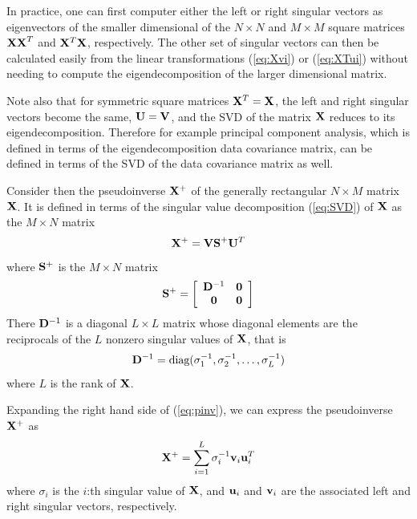 \begin{enumerate}
\begin{solution}
    In practice, one can first computer either the left or right singular vectors
    as eigenvectors of the smaller dimensional of the $N \times N$ and $M \times M$
    square matrices ${\bf XX}^T$ and ${\bf X}^T{\bf X}$, respectively. The other
    set of singular vectors can then be calculated easily from the linear transformations
    (\ref{eq:Xvi}) or (\ref{eq:XTui}) without needing to compute the eigendecomposition
    of the larger dimensional matrix.

    Note also that for symmetric square matrices ${\bf X}^T = {\bf X}$, the left and
    right singular vectors become the same, ${\bf U} = {\bf V}$, and the SVD of the matrix
    ${\bf X}$ reduces to its eigendecomposition. Therefore for example principal component
    analysis, which is defined in terms of the eigendecomposition data covariance matrix,
    can be defined in terms of the SVD of the data covariance matrix as well.

    Consider then the pseudoinverse ${\bf X}^+$ of the generally rectangular $N \times M$
    matrix ${\bf X}$. It is defined in terms of the singular value decomposition
    (\ref{eq:SVD}) of ${\bf X}$ as the $M \times N$ matrix
    \begin{equation}
      {\bf X}^+ = {\bf VS}^+{\bf U}^T
      \label{eq:pinv}
    \end{equation}
    where ${\bf S}^+$ is the $M \times N$ matrix
    \begin{equation}
      {\bf S}^+ = \left[ \begin{array}{cc}
          {\bf D}^{-1} & {\bf 0} \\
          {\bf 0} & {\bf 0} \end{array} \right]
      \label{eq:Splus}
    \end{equation}
    There ${\bf D}^{-1}$ is a diagonal $L \times L$ matrix whose diagonal elements are
    the reciprocals of the $L$ nonzero singular values of ${\bf X}$, that is
    \begin{equation}
      {\bf D}^{-1} = \mbox{diag}(\sigma_1^{-1},\sigma_2^{-1},\ldots,\sigma_L^{-1})
      \label{eq:Dinv}
    \end{equation}
    where $L$ is the rank of ${\bf X}$.

    Expanding the right hand side of (\ref{eq:pinv}), we can express the pseudoinverse
    ${\bf X}^+$ as
    \begin{equation}
      {\bf X}^+ = \sum_{i=1}^L \sigma_i^{-1} {\bf v}_i {\bf u}_i^T
      \label{eq:pinvexp}
    \end{equation}
    where $\sigma_i$ is the $i$:th singular value of ${\bf X}$, and ${\bf u}_i$ and
    ${\bf v}_i$ are the associated left and right singular vectors, respectively.


\end{solution}
\end{enumerate}

